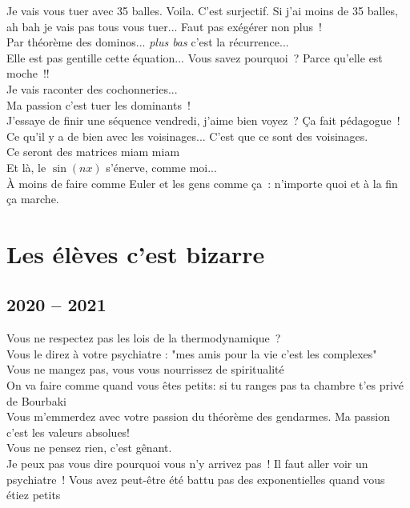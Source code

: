 \documentclass[french, a4paper, openany]{book}
\begin{document}
	\noindent \og Je vais vous tuer avec 35 balles. Voila. C'est surjectif. Si j'ai moins de 35 balles, ah bah je vais pas tous vous tuer... Faut pas exégérer non plus~! \fg \\
	\og Par théorème des dominos... \emph{plus bas} c'est la récurrence... \fg \\
	\og Elle est pas gentille cette équation... Vous savez pourquoi~? Parce qu'elle est moche~!! \fg \\
	\og Je vais raconter des cochonneries... \fg \\
	\og Ma passion c'est tuer les dominants~! \fg \\
	\og J'essaye de finir une séquence vendredi, j'aime bien voyez~? Ça fait pédagogue~! \fg \\
	\og Ce qu'il y a de bien avec les voisinages... C'est que ce sont des voisinages. \fg \\
	\og Ce seront des matrices miam miam \fg \\
	\og Et là, le $\sin (nx)$ s'énerve, comme moi... \fg \\
	\og À moins de faire comme Euler et les gens comme ça~: n'importe quoi et à la fin ça marche. \fg \\

\section*{Les élèves c'est bizarre}

	\subsection*{2020 -- 2021}

	\noindent \og Vous ne respectez pas les lois de la thermodynamique~? \fg \\
	\og Vous le direz à votre psychiatre : "mes amis pour la vie c'est les complexes" \fg \\
	\og Vous ne mangez pas, vous vous nourrissez de spiritualité \fg \\
	\og On va faire comme quand vous êtes petits: si tu ranges pas ta chambre t'es privé de Bourbaki \fg \\
	\og Vous m'emmerdez avec votre passion du théorème des gendarmes. Ma passion c'est les valeurs absolues! \fg \\
	\og Vous ne pensez rien, c'est gênant. \fg \\
	\og Je peux pas vous dire pourquoi vous n'y arrivez pas~! Il faut aller voir un psychiatre~! Vous avez peut-être été battu pas des exponentielles quand vous étiez petits \fg \\
	
\end{document}

